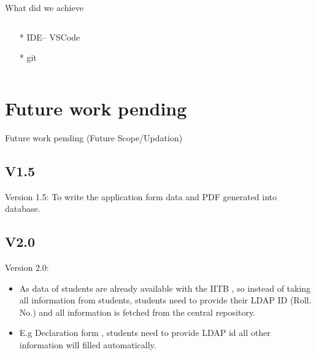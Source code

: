 \documentclass [] {beamer}
\begin{document}
\begin{frame}{What did we achieve}
\begin{columns}
\begin{column}{0.48\textwidth}
\begin{itemize}
            \item[*] IDE-- VSCode
            \item[*] git
            
        \end{itemize}
    \end{column}
    
\end{columns}

    
\end{frame}



\section{Future work pending}
\begin{frame}{Future work pending (Future Scope/Updation)}
\subsection{V1.5}
\begin{block}{Version 1.5:}
To write the application form data and PDF generated into database.
\end{block}
\subsection{V2.0}
\begin{block}{Version 2.0:}
\begin{itemize}
    \item As data of students are already available with the IITB , so instead of taking all information from students, students need to provide their LDAP ID (Roll. No.) and all information is fetched from the central repository.
    \item  E.g  Declaration form , students need to provide LDAP id all other information will filled automatically.
\end{itemize}

\end{block}
\end{frame}
\end{document}
